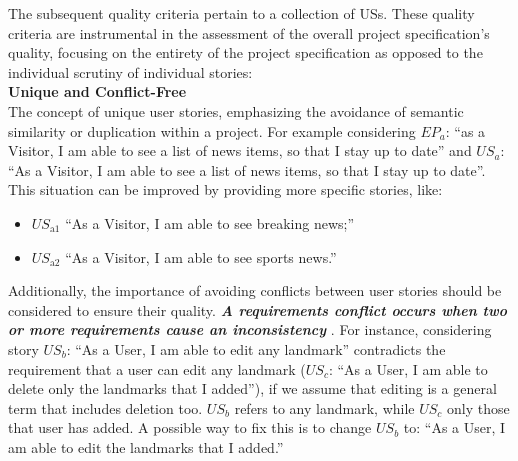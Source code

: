 The subsequent quality criteria pertain to a collection of USs. These quality criteria are instrumental in the assessment of the overall project specification's quality, focusing on the entirety of the project specification as opposed to the individual scrutiny of individual stories: \\ 
\textbf{Unique and Conflict-Free}\\ 
The concept of unique user stories, emphasizing the avoidance of semantic similarity or duplication within a project. For example considering $EP_a$: \enquote{as a Visitor, I am able to see a list of news items, so that I stay up to date} and $US_a$: \enquote{As a Visitor, I am able to see a list of news items, so that I stay up to date}. This situation can be improved by providing more specific stories, like:
\begin{itemize}
\item $US_{\text{a1}}$ \enquote{As a Visitor, I am able to see breaking news;}
\item $US_{\text{a2}}$ \enquote{As a Visitor, I am able to see sports news.}
\end{itemize}
Additionally, the importance of avoiding conflicts between user stories should be considered to ensure their quality. \textbf{\emph{A requirements conflict occurs when two or more requirements cause an inconsistency}} \cite{paja2013managing} \cite{robinson1989integrating}. For instance, considering story $US_b$: \enquote{As a User, I am able to edit any landmark} contradicts the requirement that a user can edit any landmark ($US_c$: \enquote{As a User, I am able to delete only the landmarks that I added}), if we assume that editing is a general term that includes deletion too. $US_b$ refers to any landmark, while  $US_c$ only those that user has added. A possible way to fix this is to change $US_b$ to: \enquote{As a User, I am able to edit the landmarks that I added.} \cite{lucassen2016improving}

